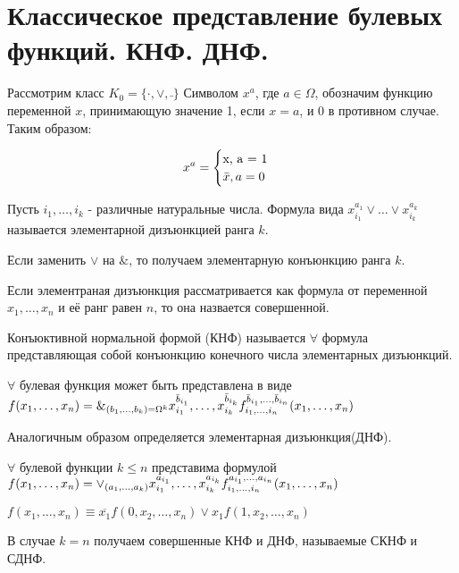 \documentclass{article}
\begin{document}
\section {Классическое представление булевых функций. КНФ. ДНФ.}

Рассмотрим класс $K_0 = \{ \cdot , \vee , \bar{ }\}$
Символом $x^a$, где $a \in \Omega $, обозначим функцию переменной $x$, принимающую значение 1, если $x = a$, и 0 в противном случае. Таким образом:
\begin{center}
	\begin{equation*}
		x^a =
		\begin{cases}
   			$x, a = 1$
			\\
			\bar{x},a = 0
 		\end{cases}
	\end{equation*}
\end{center}

\opr
Пусть $i_1, \dotsc, i_k$ - различные натуральные числа. Формула вида $x_{i_1}^{a_1} \vee \dotsc \vee x_{i_k}^{a_k}$ называется элементарной дизъюнкцией ранга $k$.\par Если заменить $\vee$ на $\&$, то получаем элементарную конъюнкцию ранга $k$. \par Если элементраная дизъюнкция рассматривается как формула от переменной $x_1, \dotsc,x_n$ и её ранг равен $n$, то она назвается совершенной.

\opr Конъюктивной нормальной формой (КНФ) называется $\forall$ формула представляющая собой конъюнкцию конечного числа элементарных дизъюнкций.

\thr $\forall$ булевая функция может быть представлена в виде $f(x_1, \dotsc, x_n) = \Large\&\normalsize_{(b_1, \dotsc, b_k) = \Omega^k} x_{i_1}^{\bar{b}_{i_1}},\dotsc,x_{i_k}^{\bar{b}_{i_k}}f_{i_1, \dotsc, i_n}^{\bar{b}_{i_1},\dotsc,\bar{b}_{i_n}}(x_1,\dotsc,x_n)$ %

\note Аналогичным образом определяется элементарная дизъюнкция(ДНФ).

\thr $\forall$ булевой функции $k\leq n$ представима формулой $f(x_1,\dotsc,x_n) = \Large\vee\normalsize_{(a_1, \dotsc, a_k)} x_{i_1}^{a_{i_1}},\dotsc,x_{i_k}^{a_{i_k}}f_{i_1, \dotsc, i_n}^{a_{i_1},\dotsc,a_{i_n}}(x_1,\dotsc,x_n)$ %

\conseq $f(x_1,\dotsc,x_n) \equiv \overline{x_1}f(0,x_2,\dotsc,x_n) \vee x_1f(1, x_2, \dotsc, x_n)$

В случае $k = n$ получаем совершенные КНФ и ДНФ, называемые СКНФ и СДНФ.
\end{document}
